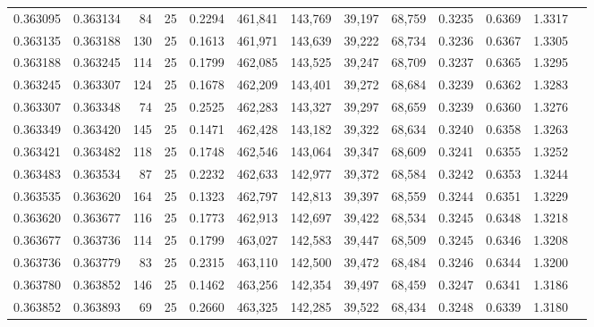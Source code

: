 \begin{tabular}{rrrrrrrrrrrrr}
0.363095 & 0.363134 &    84 &  25 &                                     0.2294 & 461,841 & 143,769 &  39,197 &  68,759 & 0.3235 & 0.6369 & 1.3317 \\
0.363135 & 0.363188 &   130 &  25 &                                     0.1613 & 461,971 & 143,639 &  39,222 &  68,734 & 0.3236 & 0.6367 & 1.3305 \\
0.363188 & 0.363245 &   114 &  25 &                                     0.1799 & 462,085 & 143,525 &  39,247 &  68,709 & 0.3237 & 0.6365 & 1.3295 \\
0.363245 & 0.363307 &   124 &  25 &                                     0.1678 & 462,209 & 143,401 &  39,272 &  68,684 & 0.3239 & 0.6362 & 1.3283 \\
0.363307 & 0.363348 &    74 &  25 &                                     0.2525 & 462,283 & 143,327 &  39,297 &  68,659 & 0.3239 & 0.6360 & 1.3276 \\
0.363349 & 0.363420 &   145 &  25 &                                     0.1471 & 462,428 & 143,182 &  39,322 &  68,634 & 0.3240 & 0.6358 & 1.3263 \\
0.363421 & 0.363482 &   118 &  25 &                                     0.1748 & 462,546 & 143,064 &  39,347 &  68,609 & 0.3241 & 0.6355 & 1.3252 \\
0.363483 & 0.363534 &    87 &  25 &                                     0.2232 & 462,633 & 142,977 &  39,372 &  68,584 & 0.3242 & 0.6353 & 1.3244 \\
0.363535 & 0.363620 &   164 &  25 &                                     0.1323 & 462,797 & 142,813 &  39,397 &  68,559 & 0.3244 & 0.6351 & 1.3229 \\
0.363620 & 0.363677 &   116 &  25 &                                     0.1773 & 462,913 & 142,697 &  39,422 &  68,534 & 0.3245 & 0.6348 & 1.3218 \\
0.363677 & 0.363736 &   114 &  25 &                                     0.1799 & 463,027 & 142,583 &  39,447 &  68,509 & 0.3245 & 0.6346 & 1.3208 \\
0.363736 & 0.363779 &    83 &  25 &                                     0.2315 & 463,110 & 142,500 &  39,472 &  68,484 & 0.3246 & 0.6344 & 1.3200 \\
0.363780 & 0.363852 &   146 &  25 &                                     0.1462 & 463,256 & 142,354 &  39,497 &  68,459 & 0.3247 & 0.6341 & 1.3186 \\
0.363852 & 0.363893 &    69 &  25 &                                     0.2660 & 463,325 & 142,285 &  39,522 &  68,434 & 0.3248 & 0.6339 & 1.3180 \\

\end{tabular}
